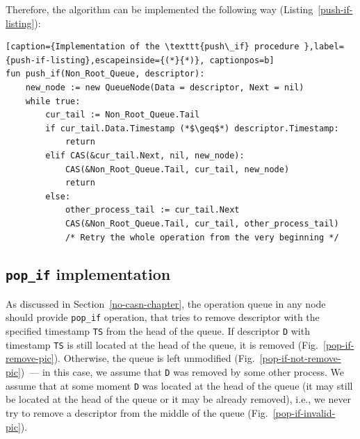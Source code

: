 \documentclass[times, dvipsnames,%
               languages={russian,english} %
              ]{itmo-student-thesis}
\begin{document}
Therefore, the algorithm can be implemented the following way (Listing~\ref{push-if-listing}):

\renewcommand{\lstlistingname}{Listing}
\begin{lstlisting}[caption={Implementation of the \texttt{push\_if} procedure },label={push-if-listing},escapeinside={(*}{*)}, captionpos=b]
fun push_if(Non_Root_Queue, descriptor):
    new_node := new QueueNode(Data = descriptor, Next = nil)
    while true:
        cur_tail := Non_Root_Queue.Tail
        if cur_tail.Data.Timestamp (*$\geq$*) descriptor.Timestamp:
            return
        elif CAS(&cur_tail.Next, nil, new_node):
            CAS(&Non_Root_Queue.Tail, cur_tail, new_node)
            return
        else:
            other_process_tail := cur_tail.Next
            CAS(&Non_Root_Queue.Tail, cur_tail, other_process_tail)
            /* Retry the whole operation from the very beginning */
\end{lstlisting}

\subsection{\texttt{pop\_if} implementation}
\label{pop-if-section}

As discussed in Section~\ref{no-casn-chapter}, the operation queue in any node should provide \texttt{pop\_if} operation, that tries to remove descriptor with the specified timestamp \texttt{TS} from the head of the queue. If descriptor \texttt{D} with timestamp \texttt{TS} is still located at the head of the queue, it is removed (Fig.~\ref{pop-if-remove-pic}). Otherwise, the queue is left unmodified (Fig.~\ref{pop-if-not-remove-pic})~--- in this case, we assume that \texttt{D} was removed by some other process. We assume that at some moment \texttt{D} was located at the head of the queue (it may still be located at the head of the queue or it may be already removed), i.e., we never try to remove a descriptor from the middle of the queue (Fig.~\ref{pop-if-invalid-pic}).
\end{document}
